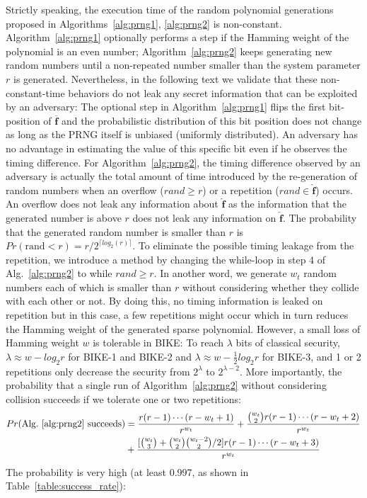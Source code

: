 \documentclass[runningheads]{llncs}
\begin{document}
Strictly speaking, the execution time of the random polynomial generations proposed in
Algorithms~\ref{alg:prng1}, \ref{alg:prng2} is non-constant.
Algorithm~\ref{alg:prng1} optionally performs a step if the
Hamming weight of the polynomial is an even number;
Algorithm~\ref{alg:prng2} keeps generating new random numbers
until a non-repeated number smaller than the system parameter $r$
is generated.
Nevertheless, in the following text we validate that
these non-constant-time behaviors do not leak any secret
information that can be exploited by an adversary:
The optional step in Algorithm~\ref{alg:prng1}
flips the first bit-position of $\mathbf{\overline{f}}$
and the probabilistic distribution of this bit position
does not change as long as the PRNG itself is unbiased (uniformly distributed).
An adversary has no advantage in estimating the value
of this specific bit even if he observes the timing difference.
For Algorithm~\ref{alg:prng2}, the timing difference
observed by an adversary is actually the total amount
of time introduced by the re-generation of random numbers
when an overflow ($rand\geq r$) or a repetition ($rand\in \mathbf{\hat{f}}$) occurs.
An overflow does not leak any information about $\mathbf{\hat{f}}$
as the information that the generated number is above $r$ does
not leak any information on $\mathbf{\hat{f}}$.
The probability that the generated random number is smaller
than $r$ is $Pr(\text{rand} < r)= r/2^{\lceil log_2(r)\rceil}$.
To eliminate the possible timing leakage from the repetition,
we introduce a method by changing the while-loop
in step 4 of Alg.~\ref{alg:prng2} to while $rand\geq r$.
In another word, we generate $w_t$ random numbers each
of which is smaller than $r$ without considering whether they collide
with each other or not.
By doing this, no timing information is leaked on repetition but
in this case, a few repetitions might occur which in turn reduces
the Hamming weight of the generated sparse polynomial.
However, a small loss of Hamming weight $w$ is tolerable in BIKE:
To reach $\lambda$ bits of classical security, $\lambda\approx w-log_2r$ for
BIKE-1 and BIKE-2 and $\lambda\approx w-\frac{1}{2}log_2r$ for BIKE-3,
and 1 or 2 repetitions only decrease the security from $2^\lambda$ to $2^{\lambda-2}$.
More importantly, the probability that a single run of Algorithm~\ref{alg:prng2} without considering collision succeeds if we tolerate one or two repetitions:
\begin{align}
    Pr(\text{Alg.~\ref{alg:prng2} succeeds})
    &=\frac{r(r-1)\cdots (r-w_t+1)}{r^{w_t}}+ \frac{\binom{w_t}{2}r(r-1)\cdots (r-w_t+2)}{r^{w_t}}\\
    &+ \frac{[\binom{w_t}{3}+\binom{w_t}{2}\binom{w_t-2}{2}/2]  r(r-1)\cdots (r-w_t+3) }{r^{w_t}}
\end{align}
The probability is very high (at least 0.997, as shown in Table~\ref{table:success_rate}):
\end{document}
